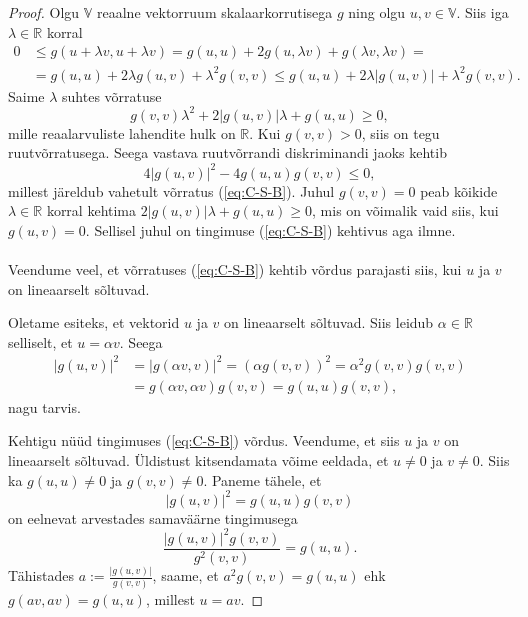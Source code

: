 \documentclass[12pt,a4paper,oneside]{article}
\theoremstyle{plain}
\theoremstyle{definition}
\numberwithin{equation}{section}
\def\R{{\mathbb R}}
\def\V{{\mathbb V}}
\begin{document}
\begin{proof}
Olgu $\V$ reaalne vektorruum skalaarkorrutisega $g$ ning olgu 
$u, v \in \V$. Siis iga $\lambda \in \R$ korral
\begin{align*}
0 &\leq g\left(u+\lambda v,u+\lambda v\right) = 
g\left(u,u\right) + 2g\left(u, \lambda v \right) + 
g\left(\lambda v, \lambda v\right) = \\
&= g\left(u,u\right) + 2\lambda g\left(u, v \right) + 
\lambda^2 g\left(v,v\right) \leq g\left(u,u\right) + 
2\lambda | g\left(u, v \right)| + \lambda^2 g\left(v,v\right).
\end{align*}
Saime $\lambda$ suhtes võrratuse
\begin{equation*}
g\left(v,v\right)\lambda^2 + 2|g\left(u, v \right)|\lambda + 
g\left(u,u\right) \geq 0,
\end{equation*}
mille reaalarvuliste lahendite hulk on $\R$. Kui 
$g\left(v,v\right) > 0$, siis on tegu ruut\-võrratusega. 
Seega vastava ruutvõrrandi 
diskriminandi jaoks kehtib
\begin{equation*}
4|g\left(u,v\right)|^2 - 4g\left(u,u\right)g\left(v,v\right) \leq 0,
\end{equation*}
millest järeldub vahetult võrratus (\ref{eq:C-S-B}). Juhul 
$g\left(v,v\right) = 0$ peab kõikide $\lambda \in \R$ korral kehtima 
$2|g\left(u,v\right)|\lambda + g\left(u,u\right) \geq 0$, mis on 
võimalik vaid siis, kui $g\left(u,v\right) = 0$. Sellisel juhul on 
tingimuse (\ref{eq:C-S-B}) kehtivus aga ilmne.
\paragraph{}
Veendume veel, et võrratuses (\ref{eq:C-S-B}) kehtib võrdus parajasti 
siis, kui $u$ ja $v$ on lineaarselt sõltuvad.

Oletame esiteks, et vektorid $u$ ja $v$ on lineaarselt sõltuvad. 
Siis leidub $\alpha \in \R$ selliselt, et $u = \alpha v$. Seega
\begin{align*}
|g\left(u,v\right)|^2 &= |g\left(\alpha v,v\right)|^2 = 
\left(\alpha g\left(v,v\right)\right)^2 = 
\alpha^2 g \left(v,v\right) g \left(v,v\right) \\
&= g \left(\alpha v,\alpha v\right)g \left( v,v\right) = 
g \left(u,u\right)g \left(v,v\right),
\end{align*}
nagu tarvis.

Kehtigu nüüd tingimuses (\ref{eq:C-S-B}) võrdus. Veendume, et siis 
$u$ ja $v$ on lineaarselt sõltuvad. Üldistust kitsendamata võime 
eeldada, et $u \neq 0$ ja $v \neq 0$. Siis ka 
$g \left(u,u\right) \neq 0$ ja $g \left(v,v\right) \neq 0$. 
Paneme tähele, et
\[|g \left(u, v \right)|^2 = g \left(u, u \right) g \left(v, v \right)\]
on eelnevat arvestades samaväärne tingimusega
\[\frac{|g \left(u, v \right)|^2 g \left(v, v \right)}
{g^2 \left(v, v \right) } = g \left(u, u \right). \]
Tähistades $a := \frac{|g \left(u, v \right)| }{g \left(v, v \right) }$, 
saame, et $a^2 g \left(v, v \right) = g \left(u, u \right)$ 
ehk $g \left(av, av \right) = g \left(u, u \right)$, millest $u = av$.
\end{proof}
\end{document}
